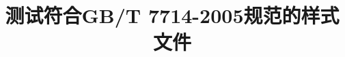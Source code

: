 \documentclass[adobefonts]{ctexart}
\begin{document}
\title{测试符合GB/T 7714-2005规范的{\BibTeX}样式文件}

\Blindtext


\nocite{*}

\end{document}
